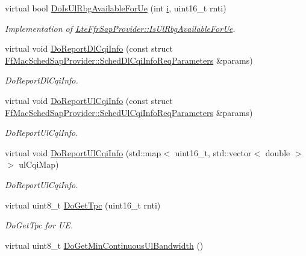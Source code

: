 \begin{DoxyCompactItemize}
virtual bool \hyperlink{classns3_1_1LteFfrSimple_a44a3d8091c7b481b71e79214aaa17664}{Do\+Is\+Ul\+Rbg\+Available\+For\+Ue} (int \hyperlink{lte__uplink__power__control_8m_a6f6ccfcf58b31cb6412107d9d5281426}{i}, uint16\+\_\+t rnti)
\begin{DoxyCompactList}\small\item\em Implementation of \hyperlink{classns3_1_1LteFfrSapProvider_a3ef80840549b8ea3d50d2cef8a9866e2}{Lte\+Ffr\+Sap\+Provider\+::\+Is\+Ul\+Rbg\+Available\+For\+Ue}. \end{DoxyCompactList}\item 
virtual void \hyperlink{classns3_1_1LteFfrSimple_a418a3f83496c3a8a3cd53cb4fdf87096}{Do\+Report\+Dl\+Cqi\+Info} (const struct \hyperlink{structns3_1_1FfMacSchedSapProvider_1_1SchedDlCqiInfoReqParameters}{Ff\+Mac\+Sched\+Sap\+Provider\+::\+Sched\+Dl\+Cqi\+Info\+Req\+Parameters} \&params)
\begin{DoxyCompactList}\small\item\em Do\+Report\+Dl\+Cqi\+Info. \end{DoxyCompactList}\item 
virtual void \hyperlink{classns3_1_1LteFfrSimple_aa31e88622a7d937d6db9a99d7296f899}{Do\+Report\+Ul\+Cqi\+Info} (const struct \hyperlink{structns3_1_1FfMacSchedSapProvider_1_1SchedUlCqiInfoReqParameters}{Ff\+Mac\+Sched\+Sap\+Provider\+::\+Sched\+Ul\+Cqi\+Info\+Req\+Parameters} \&params)
\begin{DoxyCompactList}\small\item\em Do\+Report\+Ul\+Cqi\+Info. \end{DoxyCompactList}\item 
virtual void \hyperlink{classns3_1_1LteFfrSimple_a0d99f25493af8239f36950c958265212}{Do\+Report\+Ul\+Cqi\+Info} (std\+::map$<$ uint16\+\_\+t, std\+::vector$<$ double $>$ $>$ ul\+Cqi\+Map)
\begin{DoxyCompactList}\small\item\em Do\+Report\+Ul\+Cqi\+Info. \end{DoxyCompactList}\item 
virtual uint8\+\_\+t \hyperlink{classns3_1_1LteFfrSimple_afe471805e5a9119f7729c37ca06578b7}{Do\+Get\+Tpc} (uint16\+\_\+t rnti)
\begin{DoxyCompactList}\small\item\em Do\+Get\+Tpc for UE. \end{DoxyCompactList}\item 
virtual uint8\+\_\+t \hyperlink{classns3_1_1LteFfrSimple_afa5353b76ba0cf9dab13b9f2f34cda2e}{Do\+Get\+Min\+Continuous\+Ul\+Bandwidth} ()

\end{DoxyCompactItemize}
